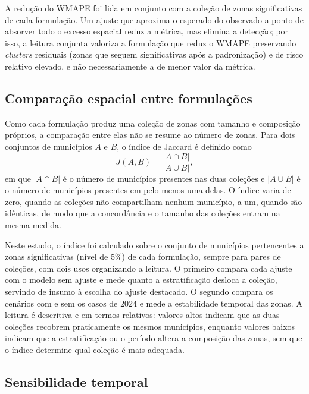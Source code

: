 A redução do WMAPE foi lida em conjunto com a coleção de zonas significativas de cada formulação. Um ajuste que aproxima o esperado do observado a ponto de absorver todo o excesso espacial reduz a métrica, mas elimina a detecção; por isso, a leitura conjunta valoriza a formulação que reduz o WMAPE preservando \textit{clusters} residuais (zonas que seguem significativas após a padronização) e de risco relativo elevado, e não necessariamente a de menor valor da métrica.

\subsection{Comparação espacial entre formulações}
\label{subsec:jaccard}

Como cada formulação produz uma coleção de zonas com tamanho e composição próprios, a comparação entre elas não se resume ao número de zonas. Para dois conjuntos de municípios $A$ e $B$, o índice de Jaccard \cite{jaccard1901} é definido como
\begin{equation}
J(A,B)=\frac{\lvert A \cap B \rvert}{\lvert A \cup B \rvert},
\label{eq:jaccard}
\end{equation}
em que $\lvert A \cap B \rvert$ é o número de municípios presentes nas duas coleções e $\lvert A \cup B \rvert$ é o número de municípios presentes em pelo menos uma delas. O índice varia de zero, quando as coleções não compartilham nenhum município, a um, quando são idênticas, de modo que a concordância e o tamanho das coleções entram na mesma medida.

Neste estudo, o índice foi calculado sobre o conjunto de municípios pertencentes a zonas significativas (nível de 5\%) de cada formulação, sempre para pares de coleções, com dois usos organizando a leitura. O primeiro compara cada ajuste com o modelo sem ajuste e mede quanto a estratificação desloca a coleção, servindo de insumo à escolha do ajuste destacado. O segundo compara os cenários com e sem os casos de 2024 e mede a estabilidade temporal das zonas. A leitura é descritiva e em termos relativos: valores altos indicam que as duas coleções recobrem praticamente os mesmos municípios, enquanto valores baixos indicam que a estratificação ou o período altera a composição das zonas, sem que o índice determine qual coleção é mais adequada.

\subsection{Sensibilidade temporal}
\label{subsec:sensibilidade_2024}

